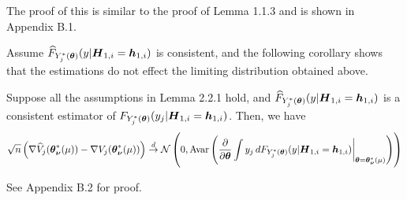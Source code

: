 The proof of this is similar to the proof of Lemma 1.1.3 and is shown in Appendix B.1.

%
%
Assume $\widehat{F}_{Y_j^*(\boldsymbol{\theta})}(y | \boldsymbol{H}_{1,i} = \boldsymbol{h}_{1,i})$ is consistent, and the following corollary shows that the estimations do not effect the limiting distribution obtained above.
\begin{corollary}
	Suppose all the assumptions in Lemma 2.2.1  hold, and $\widehat{F}_{Y_j^*(\boldsymbol{\theta})}(y | \boldsymbol{H}_{1,i} = \boldsymbol{h}_{1,i})$ is a consistent estimator of ${F}_{Y_j^*(\boldsymbol{\theta})}(y_j | \boldsymbol{H}_{1,i} = \boldsymbol{h}_{1,i})$. Then, we have
	\begin{gather}
	\begin{flalign*}
	\sqrt{n}\lt(\nabla \wh{V}_j(\bs{\theta}^*_{\bs{\nu}}(\mu))  - \nabla V_j(\bs{\theta}^*_{\bs{\nu}}(\mu))\rt)\overset{d}{\to}\mathcal{N}\lt(0,\text{Avar}\lt(\pard[\bs{\theta}] \int y_j \,d  F_{Y_j^*(\bs{\theta})}(y | \bs{H}_{1,i} = \bs{h}_{1,i})\bigg\rvert_{\bs{\theta} = \bs{\theta}^*_{\bs{\nu}}(\mu)} \rt)\rt)
	\end{flalign*}
	\end{gather}
\end{corollary}
See Appendix B.2 for proof.
